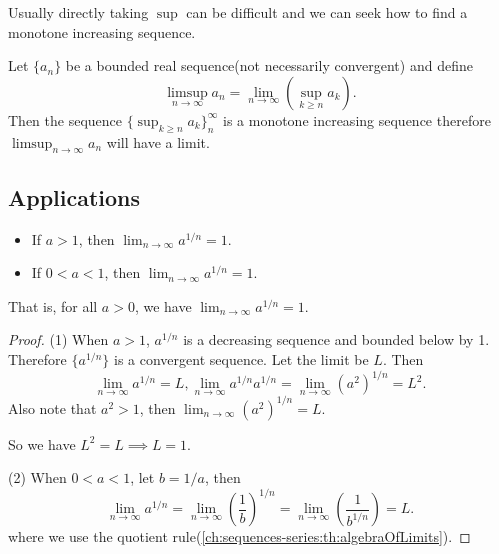 \begin{refsection}
\begin{note}
Usually directly taking $\sup$ can be difficult and we can seek how to find a monotone increasing sequence.
\end{note}

\begin{remark}
	Let $\{a_n\}$ be a bounded real sequence(not necessarily convergent) and define
	$$\limsup_{n\to\infty} a_n = \lim_{n\to\infty}(\sup_{k\geq n} a_k).$$
	Then the sequence $\{\sup_{k\geq n} a_k\}_n^\infty$ is a monotone increasing sequence therefore $\limsup_{n\to\infty} a_n$ will have a limit.	
	
\end{remark}
 
\subsection{Applications}

\begin{lemma}\label{ch:sequences-series:th:limitOfExponent}\hfill
\begin{itemize}
	\item If $a > 1$, then $\lim_{n\to \infty} a^{1/n} = 1$.
	\item If $0<a<1$, then $\lim_{n\to \infty} a^{1/n} = 1$.
\end{itemize}	
That is, for all $a>0$, we have $\lim_{n\to \infty} a^{1/n} = 1$.
	
\end{lemma}
\begin{proof}
(1) When $a > 1$, $a^{1/n}$ is a decreasing sequence and bounded below by 1. Therefore $\{a^{1/n}\}$ is a convergent sequence. Let the limit be $L$. Then
$$\lim_{n\to \infty} a^{1/n} = L, \lim_{n\to \infty} a^{1/n}a^{1/n} = \lim_{n\to \infty} (a^2)^{1/n}= L^2.$$
Also note that $a^2>1$, then $\lim_{n\to \infty} (a^2)^{1/n}= L.$

So we have $L^2 = L \implies L=1.$

(2) When $0<a<1$, let $b = 1/a$, then 
$$\lim_{n\to \infty} a^{1/n} = \lim_{n\to \infty} (\frac{1}{b})^{1/n} = \lim_{n\to \infty} (\frac{1}{b^{1/n}})= L.$$
where we use the quotient rule(\autoref{ch:sequences-series:th:algebraOfLimits}). 
\end{proof}


\begin{lemma}\label{ch:sequences-series:th:thelimitToE}\cite[53]{johnsonbaugh2010foundations}\hfill



\end{lemma}
\end{refsection}
